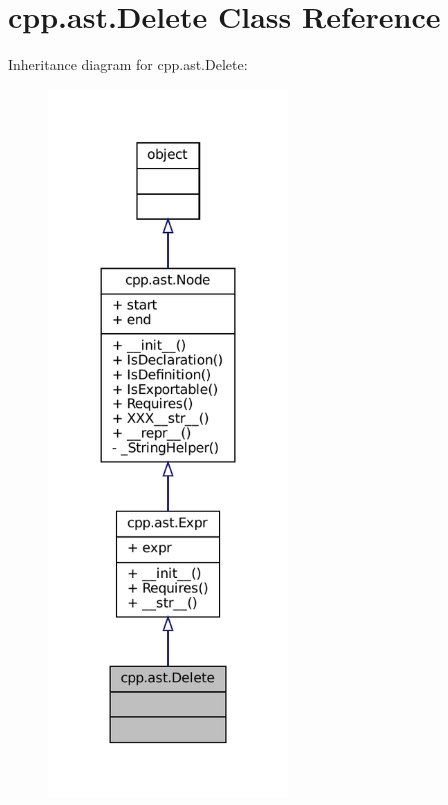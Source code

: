 \hypertarget{classcpp_1_1ast_1_1Delete}{}\section{cpp.\+ast.\+Delete Class Reference}
\label{classcpp_1_1ast_1_1Delete}


Inheritance diagram for cpp.\+ast.\+Delete\+:
\nopagebreak
\begin{figure}[H]
\begin{center}
\leavevmode
\includegraphics[width=180pt]{classcpp_1_1ast_1_1Delete__inherit__graph}
\end{center}
\end{figure}


